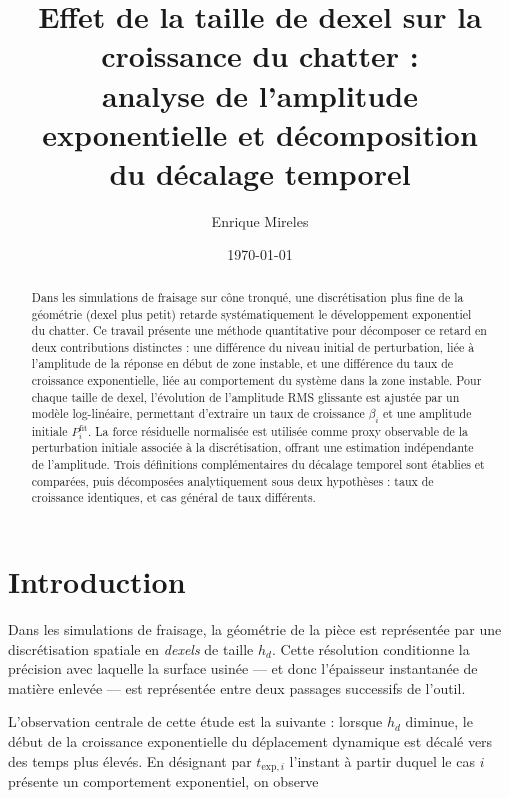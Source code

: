 \documentclass[11pt,a4paper]{article}
\title{%
    \textbf{Effet de la taille de dexel sur la croissance du chatter :}\\
    \textbf{analyse de l'amplitude exponentielle et décomposition}\\
    \textbf{du décalage temporel}%
}
\author{Enrique Mireles}
\date{\today}
\newcommand{\dxl}{h_{d}}                       %
\newcommand{\betai}{\beta_i}                   %
\newcommand{\Pfit}{P_i^{\mathrm{fit}}}         %
\begin{document}
\maketitle

\begin{abstract}
Dans les simulations de fraisage sur cône tronqué, une discrétisation plus
fine de la géométrie (dexel plus petit) retarde systématiquement le développement
exponentiel du chatter. Ce travail présente une méthode quantitative pour
décomposer ce retard en deux contributions distinctes : une différence du niveau
initial de perturbation, liée à l'amplitude de la réponse en début de zone
instable, et une différence du taux de croissance exponentielle, liée au
comportement du système dans la zone instable. Pour chaque taille de dexel,
l'évolution de l'amplitude RMS glissante est ajustée par un modèle log-linéaire,
permettant d'extraire un taux de croissance \(\betai\) et une amplitude initiale
\(\Pfit\). La force résiduelle normalisée est utilisée comme proxy observable de
la perturbation initiale associée à la discrétisation, offrant une estimation
indépendante de l'amplitude. Trois définitions complémentaires du décalage
temporel sont établies et comparées, puis décomposées analytiquement sous deux
hypothèses : taux de croissance identiques, et cas général de taux différents.
\end{abstract}

\tableofcontents
\newpage

\section{Introduction}
\label{sec:introduction}

Dans les simulations de fraisage, la géométrie de la pièce est représentée par
une discrétisation spatiale en \emph{dexels} de taille \(\dxl\). Cette résolution
conditionne la précision avec laquelle la surface usinée — et donc l'épaisseur
instantanée de matière enlevée — est représentée entre deux passages successifs
de l'outil.

L'observation centrale de cette étude est la suivante : lorsque \(\dxl\)
diminue, le début de la croissance exponentielle du déplacement dynamique est
décalé vers des temps plus élevés. En désignant par \(t_{\mathrm{exp},i}\)
l'instant à partir duquel le cas \(i\) présente un comportement exponentiel, on
observe
\end{document}
